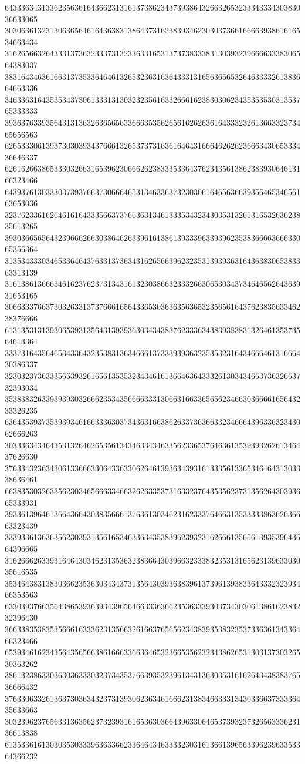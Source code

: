 64333634313362356361643662313161373862343739386432663265323334333430383036633065
30306361323130636564616436383138643731623839346230303736616666393861616534663434
31626566326433313736323337313233633165313737383338313039323966663338306564383037
38316434636166313735336464613265323631636433313165636565326463333261383664663336
34633631643535343730613331313032323561633266616238303062343535353031353765333333
39363763393564313136326365656336663535626561626263616433323261366332373465656563
62653330613937303039343766613265373731636164643166646262623666343065333436646337
62616266386533303266316539623066626238333533643762343561386238393064613166323466
64393761303330373937663730666465313463363732303061646563663935646534656163653036
32376233616264616164333566373766363134613335343234303531326131653263623835613265
39303665656432396662663038646263396161386139333963393962353836666366633065356364
31353433303465336464376331373634316265663962323531393936316436383065383363313139
31613861366634616237623731343161323038663233326630653034373464656264363931653165
30663337663730326331373766616564336530363635636532356561643762383563346238376666
61313531313930653931356431393936303434383762333634383938383132646135373564613364
33373164356465343364323538313634666137333939363235353231643466646131666430386337
32303237363335653932616561353532343461613664636433326130343466373632663732393034
35383832633939393032666235343566663331306631663365656234663036666165643233326235
63643539373539393461663336303734363166386263373636633234666439633632343062666263
30333634346435313264626535613434633434633562336537646361353939326261346437626630
37633432363430613366633064336330626461393634393161333561336534646431303338636461
66383530326335623034656663346632626335373163323764353562373135626430393665333931
39336139646136643664303835666137636130346231623337646631353333386362636663323439
33393361363635623039313561653463363435383962393231626661356561393539643664396665
31626662633931646430346231353632383664303966323338323531316562313963303035616535
35346438313830366235363034343731356430393638396137396139383364333232393466353563
63303937663564386539363934396564663336366235363339303734303061386162383232396430
36633835383535666163336231356632616637656562343839353832353733636134336466323466
65393461623435643565663861666336636465323665356232343862653130313730326530363262
38613238633036303633303237343537663935323961343136303531616264343838376536666432
37633063326136373036343237313930623634616662313834663331343033663733336435633663
30323962376563313635623732393161653630366439633064653739323732656333623136613838
61353361613030353033396363366233646434633332303161366139656339623963353364366232
